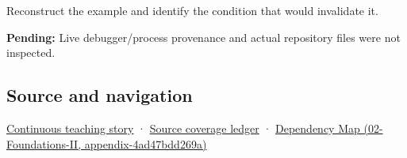 Reconstruct the example and identify the condition that would invalidate it.

\textbf{Pending:} Live debugger/process provenance and actual repository files were not inspected.

\subsection{Source and navigation}\label{appendix-230b59c0676b-source-and-navigation}

\hyperref[01-foundations-i-ch002-bytes-become-a-durable-agreement]{Continuous teaching story} · \hyperref[appendix-fd090d982a15]{Source coverage ledger} · \href{../02-Foundations-II/main.pdf\#nameddest=appendix-4ad47bdd269a}{Dependency Map (02-Foundations-II, appendix-4ad47bdd269a)}
